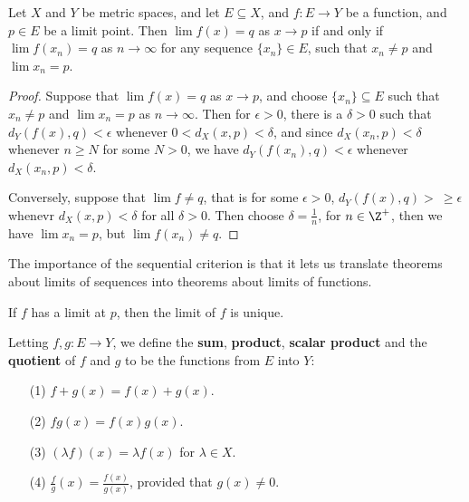 \begin{theorem}\label{4.1.1}
    Let $X$ and  $Y$ be metric spaces, and let  $E \subseteq X$, and  $f:E \rightarrow Y$ be a function,
    and  $p \in E$ be a limit point. Then  $\lim{f(x)}=q$ as  $x \rightarrow p$ if and only if
    $\lim{f(x_n)}=q$ as  $n \rightarrow \infty$ for any sequence  $\{x_n\} \in E$, such
    that  $x_n \neq p$ and  $\lim{x_n}=p$.
\end{theorem}
\begin{proof}
    Suppose that $\lim{f(x)}=q$ as  $x \rightarrow p$, and choose  $\{x_n\} \subseteq E$ such that
    $x_n \neq p$ and  $\lim{x_n}=p$ as  $n \rightarrow \infty$. Then for  $\epsilon>0$, there is a  $\delta>0$
    such that  $d_Y(f(x),q)<\epsilon$ whenever  $0<d_X(x,p)<\delta$, and since  $d_X(x_n,p)<\delta$
    whenever $n \geq N$ for some  $N>0$, we have  $d_Y(f(x_n),q)<\epsilon$ whenever  $d_X(x_n,p)<\delta$.

    Conversely, suppose that $\lim{f} \neq q$, that is for some  $\epsilon>0$,  $d_Y(f(x),q)>\ \geq \epsilon$
    whenevr  $d_X(x,p)<\delta$ for all  $\delta>0$. Then choose  $\delta=\frac{1}{n}$, for $n \in \Z^+$,
    then we have $\lim{x_n}=p$, but  $\lim{f(x_n)} \neq q$.
\end{proof}

The importance of the sequential criterion is that it lets us translate theorems about limits
of sequences into theorems about limits of functions.

\begin{corollary}
    If $f$ has a limit at  $p$, then the limit of  $f$ is unique.
\end{corollary}

\begin{definition}
    Letting $f,g:E \rightarrow Y$, we define the  \textbf{sum}, \textbf{product}, \textbf{scalar product} and the
    \textbf{quotient} of $f$ and  $g$ to be the functions from  $E$ into  $Y$:
         \begin{enumerate}
             \item[(1)] $f+g(x)=f(x)+g(x)$.

             \item[(2)] $fg(x)=f(x)g(x)$.

             \item[(3)] $(\lambda f)(x)=\lambda f(x)$ for $\lambda \in X$.

             \item[(4)] $\frac{f}{g}(x)=\frac{f(x)}{g(x)}$, provided that $g(x) \neq 0$.
        \end{enumerate}
\end{definition}

